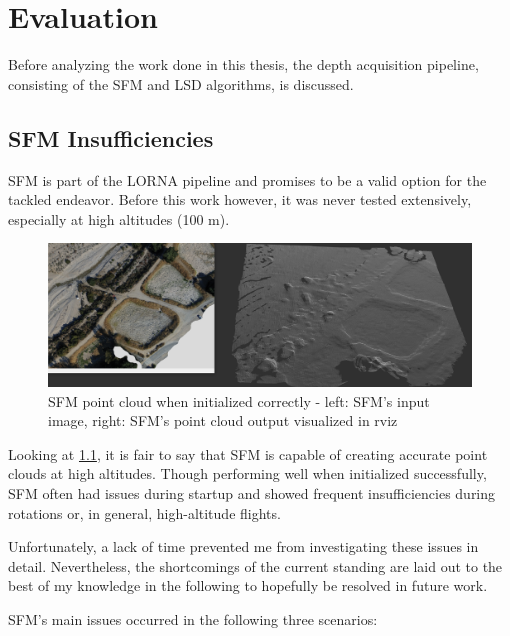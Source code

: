 \chapter{Evaluation}
\label{chapter:evaluation}

Before analyzing the work done in this thesis, the depth acquisition pipeline, consisting of the SFM and LSD algorithms, is discussed.

\section{SFM Insufficiencies}\label{subsec:sfm_insufficiencies}
SFM is part of the LORNA pipeline and promises to be a valid option for the tackled endeavor. Before this work however, it was never tested extensively, especially at high altitudes (100 m).

\begin{figure}[h]
\centering
\includegraphics[scale=0.14]{images/evaluation/SFM_issues/SFM_quality.png}
\caption{SFM point cloud when initialized correctly - left: SFM's input image, right: SFM's point cloud output visualized in rviz}
\label{fig:sfm_quality}
\end{figure}

Looking at \cref{fig:sfm_quality}, it is fair to say that SFM is capable of creating accurate point clouds at high altitudes. Though performing well when initialized successfully, SFM often had issues during startup and showed frequent insufficiencies during rotations or, in general, high-altitude flights.

Unfortunately, a lack of time prevented me from investigating these issues in detail. Nevertheless, the shortcomings of the current standing are laid out to the best of my knowledge in the following to hopefully be resolved in future work.

SFM's main issues occurred in the following three scenarios:

